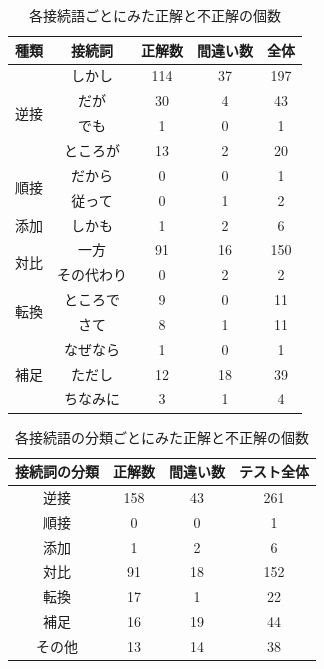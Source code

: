 \documentclass[twocolumn]{jarticle}     %
\begin{document}
\begin{table}[ht] %
	\begin{center}
		\caption{各接続語ごとにみた正解と不正解の個数}
		\label{conjunction_count}
    \small %
		\begin{tabular}{|c|c|c|c|c|}
			\hline
      種類&接続詞 & 正解数 & 間違い数 &全体\\\hline
      \multirow{4}{*}{逆接}&しかし & 114 & 37 &197\\
      &だが & 30 & 4 &43\\
      &でも & 1 & 0 & 1\\
      &ところが & 13 & 2 &20\\\hline
      \multirow{2}{*}{順接}&だから & 0 & 0 &1\\
      &従って & 0 & 1 &2\\\hline
      \multirow{1}{*}{添加}&しかも & 1 & 2 &6\\\hline
      \multirow{2}{*}{対比}&一方 & 91 & 16 &150\\
      &その代わり & 0 & 2 &2\\\hline
      \multirow{2}{*}{転換}&\cellcolor[rgb]{1.0, 0.8, 0.8}ところで & 9 & 0 &11\\
      &\cellcolor[rgb]{1.0, 0.8, 0.8}さて & 8 & 1 & 11\\\hline
      \multirow{3}{*}{補足}&なぜなら & 1 & 0 &1 \\
      &\cellcolor[rgb]{0.8, 0.8, 1.0}ただし & 12 & 18 &39\\
      &ちなみに & 3 & 1 &4\\\hline
		\end{tabular}
	\end{center}
\end{table}
\begin{table}[ht] %
	\begin{center}
		\caption{各接続語の分類ごとにみた正解と不正解の個数}
		\label{conjunction_type_count}
    \small %
		\begin{tabular}{|c|c|c|c|}
			\hline
			接続詞の分類 & 正解数 & 間違い数 & テスト全体 \\ \hline\hline
      逆接 & 158 & 43 & 261 \\ \hline
      順接 & 0 & 0 & 1 \\ \hline
      添加 & 1 & 2 & 6 \\ \hline
      対比 & 91 & 18 & 152 \\ \hline
      \cellcolor[rgb]{1.0, 0.8, 0.8}転換 & 17 & 1 & 22 \\ \hline
      \cellcolor[rgb]{0.8, 0.8, 1.0}補足 & 16 & 19 & 44 \\ \hline
      \cellcolor[rgb]{0.8, 0.8, 1.0}その他 & 13 & 14 & 38 \\ \hline

		\end{tabular}
	\end{center}
\end{table}
\end{document}
